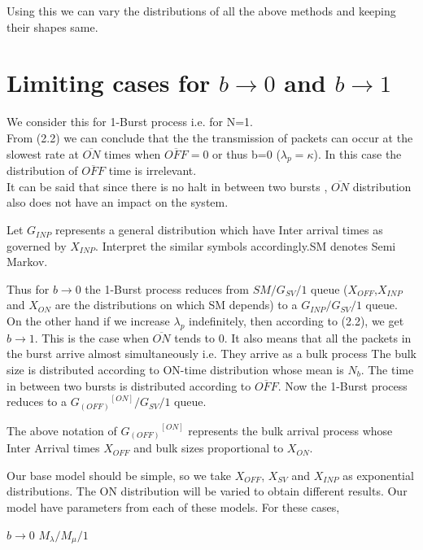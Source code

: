 Using this we can vary the distributions of all the above methods and keeping their shapes same.\\

\section{Limiting cases for $b\rightarrow 0$ and $b\rightarrow 1$}
We consider this for 1-Burst process i.e. for N=1.\\
From (2.2) we can conclude that the the transmission of packets can occur at the slowest rate at $\overline{ON}$ times when $\overline{OFF} = 0$ or thus b=0 ($\lambda_{p} = \kappa$). In this case the distribution of $\overline{OFF}$ time is irrelevant.\\
It can be said that since there is no halt in between two bursts , $\overline{ON}$ distribution also does not have an impact on the system.
\begin{remark}
Let $G_{INP}$ represents a general distribution which have Inter arrival times as governed by $X_{INP}$. Interpret the similar symbols accordingly.SM denotes Semi Markov.
\end{remark}

Thus for $b\rightarrow 0 $ the 1-Burst process reduces from $SM/G_{SV}/1$ queue ($X_{OFF}$,$X_{INP}$ and $X_{ON}$ are the distributions on which SM depends) to a $G_{INP}/G_{SV}/1$ queue.\\
On the other hand if we increase $\lambda_{p}$ indefinitely, then according to (2.2), we get $b\rightarrow 1$. This is the case when $\overline{ON}$ tends to 0. It also means that all the packets in the burst arrive almost simultaneously i.e.  They arrive as a bulk process The bulk size is distributed according to ON-time distribution whose mean is $N_{b}$. The time in between two bursts is distributed according to $\overline{OFF}$. Now the 1-Burst process reduces to a ${G_{(OFF)}}^{[ON]}/G_{SV}/1$ queue.\\
\begin{remark}
The above notation of ${G_{(OFF)}}^{[ON]}$ represents the bulk arrival process whose Inter Arrival times $X_{OFF}$ and bulk sizes proportional to $X_{ON}$.
\end{remark}

Our base model should be simple, so we take $X_{OFF}$, $X_{SV}$ and $X_{INP}$ as exponential distributions. The ON distribution will be varied to obtain different results. Our model have parameters from each of these models. For these cases,
\begin{center}
$b\rightarrow 0$  $M_{\lambda}/M_{\mu}/1$ 
\end{center}

